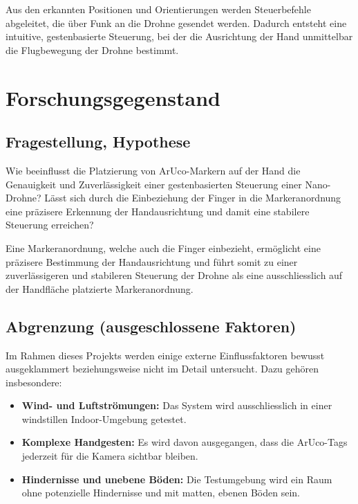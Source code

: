 Aus den erkannten Positionen und Orientierungen werden Steuerbefehle abgeleitet, die über Funk an die Drohne gesendet werden.
Dadurch entsteht eine intuitive, gestenbasierte Steuerung, bei der die Ausrichtung der Hand unmittelbar die Flugbewegung der Drohne bestimmt.

\section{Forschungsgegenstand}
\subsection{Fragestellung, Hypothese}
Wie beeinflusst die Platzierung von ArUco-Markern auf der Hand die Genauigkeit und Zuverlässigkeit einer gestenbasierten Steuerung einer Nano-Drohne?  
Lässt sich durch die Einbeziehung der Finger in die Markeranordnung eine präzisere Erkennung der Handausrichtung und damit eine stabilere Steuerung erreichen?

Eine Markeranordnung, welche auch die Finger einbezieht, ermöglicht eine präzisere Bestimmung der Handausrichtung und führt somit zu einer zuverlässigeren und stabileren Steuerung der Drohne als eine ausschliesslich auf der Handfläche platzierte Markeranordnung.

\subsection{Abgrenzung (ausgeschlossene Faktoren)}
Im Rahmen dieses Projekts werden einige externe Einflussfaktoren bewusst ausgeklammert beziehungsweise nicht im Detail untersucht.
Dazu gehören insbesondere:
\begin{itemize}
  \item \textbf{Wind- und Luftströmungen:} Das System wird ausschliesslich in einer windstillen Indoor-Umgebung getestet.
  \item \textbf{Komplexe Handgesten:} Es wird davon ausgegangen, dass die ArUco-Tags jederzeit für die Kamera sichtbar bleiben.
  \item \textbf{Hindernisse und unebene Böden:} Die Testumgebung wird ein Raum ohne potenzielle Hindernisse und mit matten, ebenen Böden sein.\footnotemark{}
\end{itemize}

\endgroup